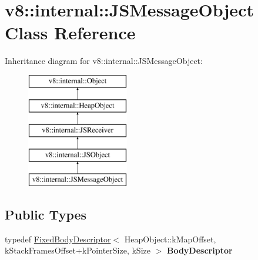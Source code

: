 \hypertarget{classv8_1_1internal_1_1_j_s_message_object}{}\section{v8\+:\+:internal\+:\+:J\+S\+Message\+Object Class Reference}
\label{classv8_1_1internal_1_1_j_s_message_object}
Inheritance diagram for v8\+:\+:internal\+:\+:J\+S\+Message\+Object\+:\begin{figure}[H]
\begin{center}
\leavevmode
\includegraphics[height=5.000000cm]{classv8_1_1internal_1_1_j_s_message_object}
\end{center}
\end{figure}
\subsection*{Public Types}
\begin{DoxyCompactItemize}
\item 
\hypertarget{classv8_1_1internal_1_1_j_s_message_object_a3376424f5b249cefd2f910cde0bca8ba}{}typedef \hyperlink{classv8_1_1internal_1_1_fixed_body_descriptor}{Fixed\+Body\+Descriptor}$<$ Heap\+Object\+::k\+Map\+Offset, k\+Stack\+Frames\+Offset+k\+Pointer\+Size, k\+Size $>$ {\bfseries Body\+Descriptor}\label{classv8_1_1internal_1_1_j_s_message_object_a3376424f5b249cefd2f910cde0bca8ba}

\end{DoxyCompactItemize}
